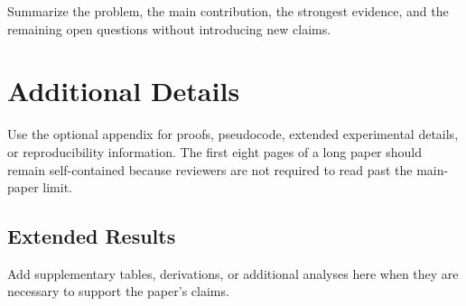 \documentclass[sigconf,anonymous,review]{acmart}
\begin{document}
Summarize the problem, the main contribution, the strongest evidence, and the
remaining open questions without introducing new claims.

% 
% 


\appendix
\section{Additional Details}
\label{app:details}

Use the optional appendix for proofs, pseudocode, extended experimental
details, or reproducibility information. The first eight pages of a long
paper should remain self-contained because reviewers are not required to read
past the main-paper limit.

\subsection{Extended Results}
\label{app:extended-results}

Add supplementary tables, derivations, or additional analyses here when they
are necessary to support the paper's claims.
\end{document}
